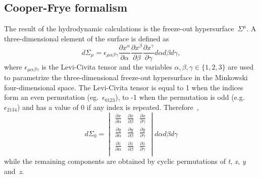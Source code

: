     \subsection{Cooper-Frye formalism}
      The result of the hydrodynamic calculations is the freeze-out hypersurface~$\Sigma^\mu$.
      A three-dimensional element of the surface is defined as~\cite{therminator2} 
      \begin{equation}
      d\Sigma_\mu = \epsilon_{\mu\alpha\beta\gamma} \frac{\partial x^\alpha}{\partial \alpha} \frac{\partial x^\beta}{\partial \beta} \frac{\partial x^\gamma}{\partial \gamma} d\alpha d\beta d\gamma ,
      \end{equation}
      where $\epsilon_{\mu\alpha\beta\gamma}$ is the Levi-Civita tensor and the variables $\alpha, \beta, \gamma \in \{1,2,3\}$ are used to parametrize the three-dimensional freeze-out hypersurface in the Minkowski four-dimensional space.
      The Levi-Civita tensor is equal to 1 when the indices form an even permutation (eg.~$\epsilon_{0123}$), to -1 when the permutation is odd (e.g. $\epsilon_{2134}$) and has a value of 0 if any index is repeated. Therefore~\cite{therminator2},
      \begin{equation}
        d \Sigma_0  = 
        \begin{vmatrix}
          \frac{\partial x}{\partial \alpha} & \frac{\partial x}{\partial \beta} & \frac{\partial x}{\partial \gamma} \\
          \frac{\partial y}{\partial \alpha} & \frac{\partial y}{\partial \beta} & \frac{\partial y}{\partial \gamma} \\
          \frac{\partial z}{\partial \alpha} & \frac{\partial z}{\partial \beta} & \frac{\partial z}{\partial \gamma} \\
        \end{vmatrix} d \alpha d \beta d \gamma
      \end{equation}
      while the remaining components are obtained by cyclic permutations of \textit{t}, \textit{x}, \textit{y} and~\textit{z}.


